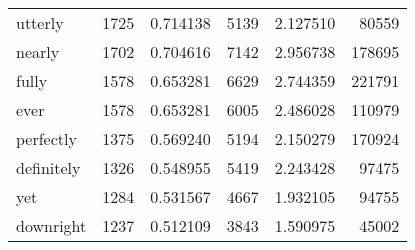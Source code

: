 \begin{table}[ht]
\begin{tabular}{lrrrrr}
utterly & {\cellcolor[HTML]{9DB9D9}} \color[HTML]{000000} 1725 & {\cellcolor[HTML]{9DB9D9}} \color[HTML]{000000} 0.714138 & {\cellcolor[HTML]{AAC4DE}} \color[HTML]{000000} 5139 & {\cellcolor[HTML]{AAC4DE}} \color[HTML]{000000} 2.127510 & {\cellcolor[HTML]{EEF5F9}} \color[HTML]{000000} 80559 \\
nearly & {\cellcolor[HTML]{9EBCDA}} \color[HTML]{000000} 1702 & {\cellcolor[HTML]{9EBCDA}} \color[HTML]{000000} 0.704616 & {\cellcolor[HTML]{91A1CC}} \color[HTML]{F1F1F1} 7142 & {\cellcolor[HTML]{91A1CC}} \color[HTML]{F1F1F1} 2.956738 & {\cellcolor[HTML]{E1EDF5}} \color[HTML]{000000} 178695 \\
fully & {\cellcolor[HTML]{A5C1DC}} \color[HTML]{000000} 1578 & {\cellcolor[HTML]{A5C1DC}} \color[HTML]{000000} 0.653281 & {\cellcolor[HTML]{96ABD1}} \color[HTML]{F1F1F1} 6629 & {\cellcolor[HTML]{96ABD1}} \color[HTML]{F1F1F1} 2.744359 & {\cellcolor[HTML]{DBE8F2}} \color[HTML]{000000} 221791 \\
ever & {\cellcolor[HTML]{A5C1DC}} \color[HTML]{000000} 1578 & {\cellcolor[HTML]{A5C1DC}} \color[HTML]{000000} 0.653281 & {\cellcolor[HTML]{9CB8D8}} \color[HTML]{000000} 6005 & {\cellcolor[HTML]{9CB8D8}} \color[HTML]{000000} 2.486028 & {\cellcolor[HTML]{EAF3F8}} \color[HTML]{000000} 110979 \\
perfectly & {\cellcolor[HTML]{B1C9E1}} \color[HTML]{000000} 1375 & {\cellcolor[HTML]{B1C9E1}} \color[HTML]{000000} 0.569240 & {\cellcolor[HTML]{A9C4DE}} \color[HTML]{000000} 5194 & {\cellcolor[HTML]{A9C4DE}} \color[HTML]{000000} 2.150279 & {\cellcolor[HTML]{E3EEF5}} \color[HTML]{000000} 170924 \\
definitely & {\cellcolor[HTML]{B4CCE2}} \color[HTML]{000000} 1326 & {\cellcolor[HTML]{B4CCE2}} \color[HTML]{000000} 0.548955 & {\cellcolor[HTML]{A6C2DD}} \color[HTML]{000000} 5419 & {\cellcolor[HTML]{A6C2DD}} \color[HTML]{000000} 2.243428 & {\cellcolor[HTML]{EBF4F8}} \color[HTML]{000000} 97475 \\
yet & {\cellcolor[HTML]{B6CDE3}} \color[HTML]{000000} 1284 & {\cellcolor[HTML]{B6CDE3}} \color[HTML]{000000} 0.531567 & {\cellcolor[HTML]{B3CBE2}} \color[HTML]{000000} 4667 & {\cellcolor[HTML]{B3CBE2}} \color[HTML]{000000} 1.932105 & {\cellcolor[HTML]{ECF4F9}} \color[HTML]{000000} 94755 \\
downright & {\cellcolor[HTML]{BACFE4}} \color[HTML]{000000} 1237 & {\cellcolor[HTML]{BACFE4}} \color[HTML]{000000} 0.512109 & {\cellcolor[HTML]{C2D5E7}} \color[HTML]{000000} 3843 & {\cellcolor[HTML]{C2D5E7}} \color[HTML]{000000} 1.590975 & {\cellcolor[HTML]{F2F8FB}} \color[HTML]{000000} 45002 \\

\end{tabular}
\end{table}
